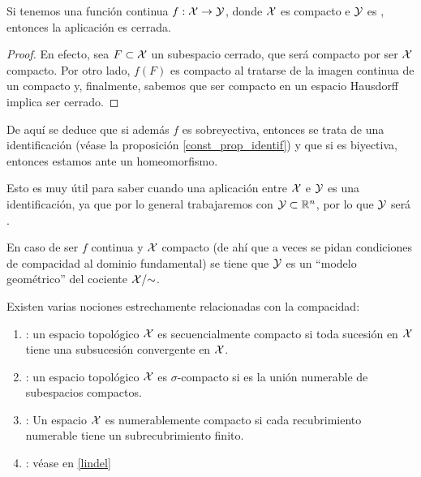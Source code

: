 \begin{lem}
	Si tenemos una función continua $f: \mathcal{X}\to \mathcal{Y}$, donde $\mathcal{X}$ es compacto e $\mathcal{Y}$ es \hausdorff, entonces la aplicación es cerrada.
\end{lem}
\begin{proof}
	En efecto, sea $F\subset \mathcal{X}$ un subespacio cerrado, que será compacto por ser $\mathcal{X}$ compacto. Por otro lado, $f(F)$ es compacto al tratarse de la imagen continua de un compacto y, finalmente, sabemos que ser compacto en un espacio Hausdorff implica ser cerrado.
\end{proof}
\begin{obs}[Identificaciones]
	De aquí se deduce que si además $f$ es sobreyectiva, entonces se trata de una identificación (véase la proposición \ref{const_prop_identif}) y que si es biyectiva, entonces estamos ante un homeomorfismo. 
	
	Esto es muy útil para saber cuando una aplicación entre $\mathcal{X}$ e $\mathcal{Y}$ es una identificación, ya que por lo general trabajaremos con $\mathcal{Y}\subset\mathbb{R}^n$, por lo que $\mathcal{Y}$ será \hausdorff.
	
	En caso de ser $f$ continua y $\mathcal{X}$ compacto (de ahí que a veces se pidan condiciones de compacidad al dominio fundamental) se tiene que $\mathcal{Y}$ es un ``modelo geométrico'' del cociente $\mathcal{X}/\mathord{\sim}$.
\end{obs}
\begin{defi} Existen varias nociones estrechamente relacionadas con la compacidad:
	\begin{enumerate}
		\item {}: un espacio topológico	$\mathcal{X}$ es secuencialmente compacto si toda sucesión en $\mathcal{X}$ tiene una subsucesión convergente en $\mathcal{X}$.
		\item {}:  un espacio topológico $\mathcal{X}$ es $\sigma$-compacto si es la unión numerable de subespacios compactos.
		\item {}: Un espacio $\mathcal{X}$ es numerablemente compacto si cada recubrimiento numerable tiene un subrecubrimiento finito.
		\item {}: véase en \ref{lindel}
	\end{enumerate}
\end{defi}

